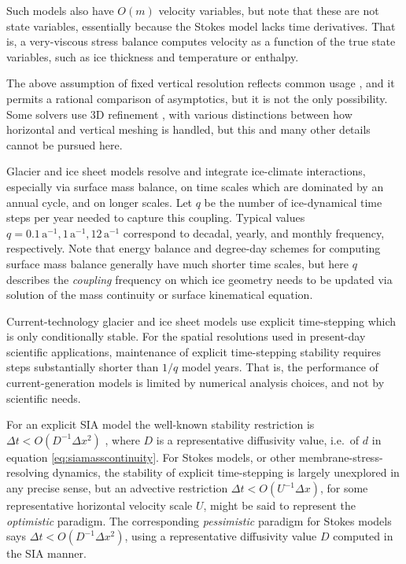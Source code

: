 \documentclass[review]{igs}
\begin{document}
Such models also have $O(m)$ velocity variables, but note that these are not state variables, essentially because the Stokes model lacks time derivatives.  That is, a very-viscous stress balance computes velocity as a function of the true state variables, such as ice thickness and temperature or enthalpy.

The above assumption of fixed vertical resolution reflects common usage \citep[for example]{Aschwandenetal2019,BrinkerhoffJohnson2015,Hoffmanetal2018,Lengetal2012,
Winkelmannetal2011}, and it permits a rational comparison of asymptotics, but it is not the only possibility.  Some solvers use 3D refinement \citep{BrownSmithAhmadia2013,IsaacStadlerGhattas2015,Tuminaroetal2016}, with various distinctions between how horizontal and vertical meshing is handled, but this and many other details cannot be pursued here.

Glacier and ice sheet models resolve and integrate ice-climate interactions, especially via surface mass balance, on time scales which are dominated by an annual cycle, and on longer scales.  Let $q$ be the number of ice-dynamical time steps per year needed to capture this coupling.  Typical values $q=0.1 \,\text{a}^{-1}, 1 \,\text{a}^{-1}, 12 \,\text{a}^{-1}$ correspond to decadal, yearly, and monthly frequency, respectively.  Note that energy balance and degree-day schemes for computing surface mass balance \citep{Hock2005} generally have much shorter time scales, but here $q$ describes the \emph{coupling} frequency on which ice geometry needs to be updated via solution of the mass continuity or surface kinematical equation.

Current-technology glacier and ice sheet models use explicit time-stepping which is only conditionally stable.  For the spatial resolutions used in present-day scientific applications, maintenance of explicit time-stepping stability requires steps substantially shorter than $1/q$ model years.  That is, the performance of current-generation models is limited by numerical analysis choices, and not by scientific needs.

For an explicit SIA model the well-known stability restriction is $\Delta t < O(D^{-1} \Delta x^2)$ \citep{Bueleretal2005,HindmarshPayne1996}, where $D$ is a representative diffusivity value, i.e.~of $d$ in equation \eqref{eq:siamasscontinuity}.  For Stokes models, or other membrane-stress-resolving dynamics, the stability of explicit time-stepping is largely unexplored in any precise sense, but an advective restriction $\Delta t < O(U^{-1} \Delta x)$, for some representative horizontal velocity scale $U$, might be said to represent the \emph{optimistic} paradigm.  The corresponding \emph{pessimistic} paradigm for Stokes models says $\Delta t < O(D^{-1} \Delta x^2)$, using a representative diffusivity value $D$ computed in the SIA manner.
\end{document}
